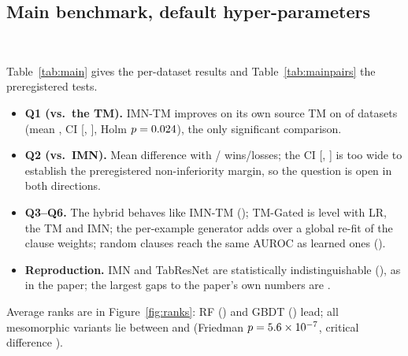 \documentclass[10pt,a4paper]{article}
\newcommand{\imn}{\textsc{IMN}}
\newcommand{\arm}[1]{\textsf{#1}}
\begin{document}
\subsection{Main benchmark, default hyper-parameters}\label{sec:main}
\begin{table}[t]
  \centering
  \caption{Test AUROC (mean{\tiny$\pm$sd} over \MainSeeds{} seeds), default hyper-parameters. Top: baselines;
  bottom: TM family, with \imn{} repeated for reference. Bold: best within each half. Last column: the paper's
  Table~8 \imn{} value (its own split; reference only).}
  \label{tab:main}
  \small
  \resizebox{\textwidth}{!}{}\\[4pt]
  \resizebox{\textwidth}{!}{}
\end{table}
\begin{table}[t]
  \centering\small
  \caption{Preregistered comparisons, default hyper-parameters (\MainDatasets{} datasets).
  $^\ast$: Holm-corrected $p<0.05$.}
  \label{tab:mainpairs}
  
\end{table}
Table~\ref{tab:main} gives the per-dataset results and Table~\ref{tab:mainpairs} the preregistered tests.
\begin{itemize}
  \item \textbf{Q1 (vs.\ the TM).} \arm{IMN-TM} improves on its own source TM on \MainimntmtmWins{} of
        \MainDatasets{} datasets (mean \MainimntmtmMean, CI [\MainimntmtmLo, \MainimntmtmHi], Holm
        $p=0.024$), the only significant comparison.
  \item \textbf{Q2 (vs.\ \imn).} Mean difference \MainimntmimnMean{} with \MainimntmimnWins/\MainimntmimnLosses{}
        wins/losses; the CI [\MainimntmimnLo, \MainimntmimnHi] is too wide to establish the preregistered
        non-inferiority margin, so the question is open in both directions.
  \item \textbf{Q3--Q6.} The hybrid behaves like \arm{IMN-TM} (\MainimnhybridimntmMean); \arm{TM-Gated} is
        level with LR, the TM and \imn{}; the per-example generator adds \MainimntmclauselrMean{} over a
        global re-fit of the clause weights; random clauses reach the same AUROC as learned ones
        (\MainimntmimntmrandMean).
  \item \textbf{Reproduction.} \imn{} and TabResNet are statistically indistinguishable
        (\MainimntabresnetMean), as in the paper; the largest gaps to the paper's own numbers are
        \MainWorstPaperGap.
\end{itemize}
Average ranks are in Figure~\ref{fig:ranks}: RF (\MainRankrf) and GBDT (\MainRankgbdt) lead; all
mesomorphic variants lie between \MainRankimntmrand{} and \MainRanktmgated{} (Friedman
$p=5.6\times 10^{-7}$, critical difference \MainCD).
\end{document}
